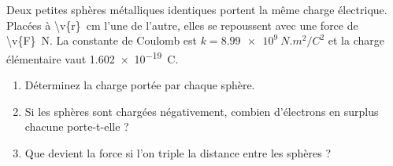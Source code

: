 Deux petites sphères métalliques identiques portent la même charge électrique. Placées à \qty{\v{r}}{cm} l'une de l'autre, elles se repoussent avec une force de \qty{\v{F}}{N}. La constante de Coulomb est $k = \qty{8.99e9}{N.m^2/C^2}$ et la charge élémentaire vaut \qty{1.602e-19}{C}.

\begin{enumerate}[label=\alph*)]
    \item Déterminez la charge portée par chaque sphère.
    \item Si les sphères sont chargées négativement, combien d'électrons en surplus chacune porte-t-elle ?
    \item Que devient la force si l'on triple la distance entre les sphères ?
\end{enumerate}
